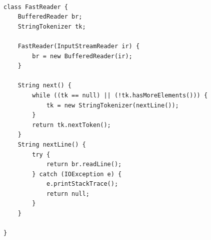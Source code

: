 \begin{verbatim}

class FastReader {
    BufferedReader br;
    StringTokenizer tk;

    FastReader(InputStreamReader ir) {
        br = new BufferedReader(ir);
    }

    String next() {
        while ((tk == null) || (!tk.hasMoreElements())) {
            tk = new StringTokenizer(nextLine());
        }
        return tk.nextToken();
    }
    String nextLine() {
        try {
            return br.readLine();
        } catch (IOException e) {
            e.printStackTrace();
            return null;
        }
    }

}

\end{verbatim}

